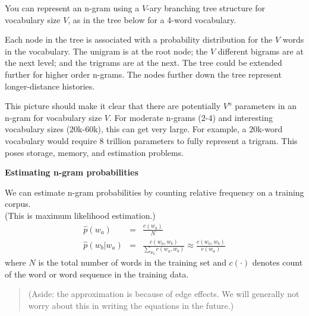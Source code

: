 \documentclass[11pt,titlepage]{article}
\begin{document}
\clearpage

You can represent an n-gram using a $V$-ary branching tree structure for vocabulary
size $V$, as in the tree below for a 4-word vocabulary.

\vskip -0.2in
\centerline{}
\vskip -0.1in

Each node in the tree is associated with a probability distribution for
the $V$ words in the vocabulary.  The unigram is at the root node; the $V$ different
bigrams are at the next level; and the trigrams are at the next.  The tree could
be extended further for higher order n-grams.  The nodes further down the tree
represent longer-distance histories.
\vskip 0.1in

This picture should make it clear that there are potentially $V^n$
parameters in an n-gram for vocabulary size $V$.  For moderate n-grams
(2-4) and interesting vocabulary sizes (20k-60k), this can get very large.
For example, a 20k-word vocabulary would require 8 trillion parameters to fully represent a trigram. This poses storage, memory, and estimation problems.


\clearpage


\centerline{{\huge \bf Estimating n-gram probabilities}}
\vskip 0.2in

We can estimate n-gram probabilities by counting relative frequency
on a training corpus.\\
(This is  maximum likelihood estimation.)
\begin{eqnarray*}
\hat p(w_a) & = & \frac{c(w_a)}{N} \\
\hat p(w_b|w_a) & = & \frac{c(w_a,w_b)}{\sum_{w_b}c(w_a,w_b)} \approx  \frac{c(w_a,w_b)}{c(w_a)}
\end{eqnarray*}
where $N$ is the total number of words in the training set and $c(\cdot)$ denotes
count of the word or word sequence in the training data. 
{\sl \Large
\begin{quote}
(Aside: the approximation is because of edge effects.  We will
generally not worry about this in writing the equations in the
future.)
\end{quote}
}
\end{document}
